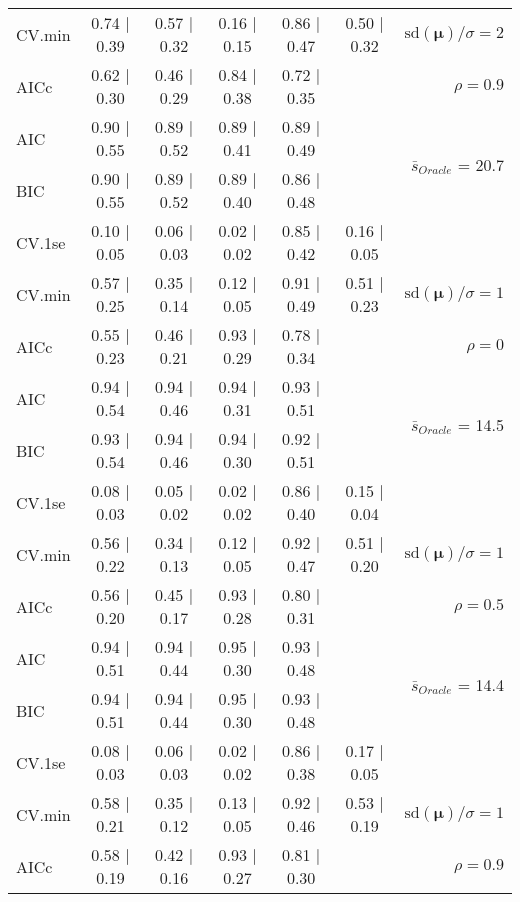 \begin{table}
\begin{center}
\begin{tabular}{l*{5}{c}|r}
CV.min & 0.74 $\mid$ 0.39 & 0.57 $\mid$ 0.32 & 0.16 $\mid$ 0.15 & 0.86 $\mid$ 0.47 & 0.50 $\mid$ 0.32 &  $\mathrm{sd}(\mathbf{\mu})/\sigma=2$ \\
AICc & 0.62 $\mid$ 0.30 & 0.46 $\mid$ 0.29 & 0.84 $\mid$ 0.38 & 0.72 $\mid$ 0.35 & & $\rho=0.9$ \\
AIC & 0.90 $\mid$ 0.55 & 0.89 $\mid$ 0.52 & 0.89 $\mid$ 0.41 & 0.89 $\mid$ 0.49 & &  \multirow{2}{*}{$\bar{s}_{Oracle}$ = 20.7} \\
BIC & 0.90 $\mid$ 0.55 & 0.89 $\mid$ 0.52 & 0.89 $\mid$ 0.40 & 0.86 $\mid$ 0.48 & &  \\
 \hline 
CV.1se & 0.10 $\mid$ 0.05 & 0.06 $\mid$ 0.03 & 0.02 $\mid$ 0.02 & 0.85 $\mid$ 0.42 & 0.16 $\mid$ 0.05 & \\
CV.min & 0.57 $\mid$ 0.25 & 0.35 $\mid$ 0.14 & 0.12 $\mid$ 0.05 & 0.91 $\mid$ 0.49 & 0.51 $\mid$ 0.23 &  $\mathrm{sd}(\mathbf{\mu})/\sigma=1$ \\
AICc & 0.55 $\mid$ 0.23 & 0.46 $\mid$ 0.21 & 0.93 $\mid$ 0.29 & 0.78 $\mid$ 0.34 & & $\rho=0$ \\
AIC & 0.94 $\mid$ 0.54 & 0.94 $\mid$ 0.46 & 0.94 $\mid$ 0.31 & 0.93 $\mid$ 0.51 & &  \multirow{2}{*}{$\bar{s}_{Oracle}$ = 14.5} \\
BIC & 0.93 $\mid$ 0.54 & 0.94 $\mid$ 0.46 & 0.94 $\mid$ 0.30 & 0.92 $\mid$ 0.51 & &  \\
 \hline 
CV.1se & 0.08 $\mid$ 0.03 & 0.05 $\mid$ 0.02 & 0.02 $\mid$ 0.02 & 0.86 $\mid$ 0.40 & 0.15 $\mid$ 0.04 & \\
CV.min & 0.56 $\mid$ 0.22 & 0.34 $\mid$ 0.13 & 0.12 $\mid$ 0.05 & 0.92 $\mid$ 0.47 & 0.51 $\mid$ 0.20 &  $\mathrm{sd}(\mathbf{\mu})/\sigma=1$ \\
AICc & 0.56 $\mid$ 0.20 & 0.45 $\mid$ 0.17 & 0.93 $\mid$ 0.28 & 0.80 $\mid$ 0.31 & & $\rho=0.5$ \\
AIC & 0.94 $\mid$ 0.51 & 0.94 $\mid$ 0.44 & 0.95 $\mid$ 0.30 & 0.93 $\mid$ 0.48 & &  \multirow{2}{*}{$\bar{s}_{Oracle}$ = 14.4} \\
BIC & 0.94 $\mid$ 0.51 & 0.94 $\mid$ 0.44 & 0.95 $\mid$ 0.30 & 0.93 $\mid$ 0.48 & &  \\
 \hline 
CV.1se & 0.08 $\mid$ 0.03 & 0.06 $\mid$ 0.03 & 0.02 $\mid$ 0.02 & 0.86 $\mid$ 0.38 & 0.17 $\mid$ 0.05 & \\
CV.min & 0.58 $\mid$ 0.21 & 0.35 $\mid$ 0.12 & 0.13 $\mid$ 0.05 & 0.92 $\mid$ 0.46 & 0.53 $\mid$ 0.19 &  $\mathrm{sd}(\mathbf{\mu})/\sigma=1$ \\
AICc & 0.58 $\mid$ 0.19 & 0.42 $\mid$ 0.16 & 0.93 $\mid$ 0.27 & 0.81 $\mid$ 0.30 & & $\rho=0.9$ \\

\end{tabular}
\end{center}
\end{table}
